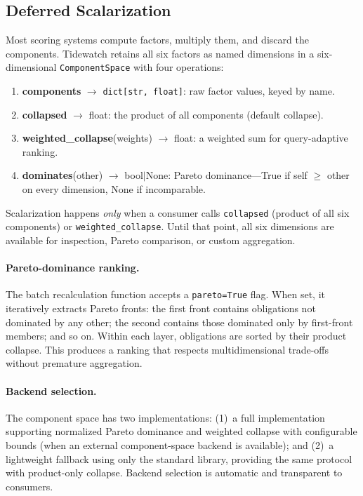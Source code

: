 \documentclass[11pt]{article}
\begin{document}
\subsection{Deferred Scalarization}
\label{sec:deferred}

Most scoring systems compute factors, multiply them, and discard the
components.  Tidewatch retains all six factors as named dimensions
in a six-dimensional \texttt{ComponentSpace} with four operations:

\begin{enumerate}[nosep]
  \item \textbf{components} $\to$ \texttt{dict[str, float]}:
        raw factor values, keyed by name.
  \item \textbf{collapsed} $\to$ float:
        the product of all components (default collapse).
  \item \textbf{weighted\_collapse}(weights) $\to$ float:
        a weighted sum for query-adaptive ranking.
  \item \textbf{dominates}(other) $\to$ bool$\mid$None:
        Pareto dominance---True if self $\geq$ other on every
        dimension, None if incomparable.
\end{enumerate}

Scalarization happens \emph{only} when a consumer calls
\texttt{collapsed} (product of all six components) or
\texttt{weighted\_collapse}.  Until that point, all six dimensions
are available for inspection, Pareto comparison, or custom
aggregation.

\paragraph{Pareto-dominance ranking.}
The batch recalculation function accepts a \texttt{pareto=True}
flag.  When set, it iteratively extracts Pareto fronts: the first
front contains obligations not dominated by any other; the second
contains those dominated only by first-front members; and so on.
Within each layer, obligations are sorted by their product collapse.
This produces a ranking that respects multidimensional trade-offs
without premature aggregation.

\paragraph{Backend selection.}
The component space has two implementations:
(1)~a full implementation supporting normalized Pareto dominance
and weighted collapse with configurable bounds (when an external
component-space backend is available); and
(2)~a lightweight fallback using only the standard library,
providing the same protocol with product-only collapse.
Backend selection is automatic and transparent to consumers.
\end{document}
